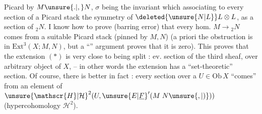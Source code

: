 \margin{\mbox{-- --}}

Picard   by $M\unsure{.|,}N$, $\sigma$ being the invariant which  associating to every section  of a Picard stack the symmetry of $\deleted{\unsure{N|L}}L\otimes L$,  as a section of ${}_{2}N$. I know how to prove (barring error) that every hom. $M\to{}_{2}N$ comes from a suitable Picard stack (pinned by $M,N$) (a priori the obstruction is in $\mathrm{Ext}^{3}(X;M,N)$, but a ``'' argument proves that it is zero). This proves that the extension $(*)$ is very close to being split :  ev. section of the third sheaf, over  arbitrary object of $X$,  -- in other words the extension has a ``set-theoretic'' section. Of course, there is better in fact : every section over a $U\in\mathrm{Ob}\,X$ ``comes'' from an element of ${\unsure{\mathscr{H}|\mathcal{H}}}^{2}(U,{\unsure{E|\underline{F}}}'(M\;N\unsure{,|)}))$ (hypercohomology $\mathscr{H}^{2}$).

